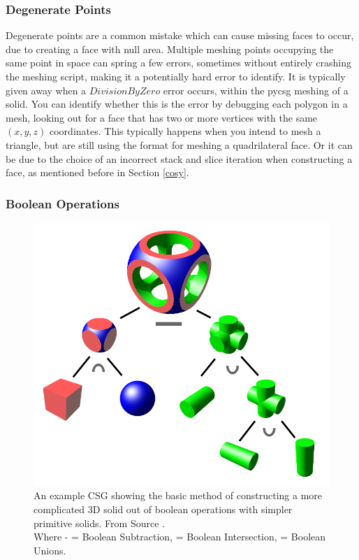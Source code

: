 \documentclass[12pt,a4paper]{article}
\begin{document}
\subsubsection{Degenerate Points}
Degenerate points are a common mistake which can cause missing faces to occur, due to creating a face with null area. Multiple meshing points occupying the same point in space can spring a few errors, sometimes without entirely crashing the meshing script, making it a potentially hard error to identify. It is typically given away when a $DivisionByZero$ error occurs, within the pycsg meshing of a solid. You can identify whether this is the error by debugging each polygon in a mesh, looking out for a face that has two or more vertices with the same $(x,y,z)$ coordinates. This typically happens when you intend to mesh a triangle, but are still using the format for meshing a quadrilateral face. Or it can be due to the choice of an incorrect stack and slice iteration when constructing a face, as mentioned before in Section \ref{cosy}.

\newpage
\subsubsection{Boolean Operations}
\label{bool}

\begin{figure}[h!]
\centering
\includegraphics[scale=0.25]{Images//Booleans//Boolean.png}
\caption[width=\columnwidth]{An example CSG showing the basic method of constructing a more complicated 3D solid out of boolean operations with simpler primitive solids. From Source \cite{wiki}.\\
Where - = Boolean Subtraction, \cap = Boolean Intersection, \cup = Boolean Unions.}
\label{booly}
\end{figure}
\end{document}
